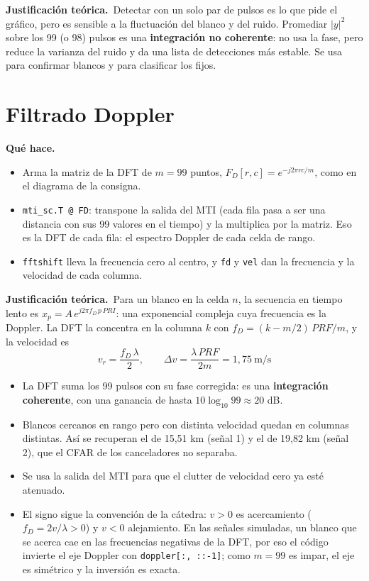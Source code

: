 \documentclass[11pt]{article}
\newcommand{\codigo}[2]{}
\newcommand{\teoria}{\par\textcolor{verde}{\textbf{Justificación teórica.}}\ }
\newcommand{\hace}{\par\textcolor{verde}{\textbf{Qué hace.}}\ }
\newcommand{\archivo}[1]{\texttt{#1}}
\begin{document}
\teoria Detectar con un solo par de pulsos es lo que pide el gráfico, pero es sensible a la fluctuación del blanco y del ruido. Promediar $|y|^2$ sobre los 99 (o 98) pulsos es una \textbf{integración no coherente}: no usa la fase, pero reduce la varianza del ruido y da una lista de detecciones más estable. Se usa para confirmar blancos y para clasificar los fijos.

\section{Filtrado Doppler}
\codigo{234}{244}
\hace
\begin{itemize}
  \item Arma la matriz de la DFT de $m = 99$ puntos, $F_D[r,c] = e^{-j2\pi rc/m}$, como en el diagrama de la consigna.
  \item \archivo{mti\_sc.T @ FD}: transpone la salida del MTI (cada fila pasa a ser una distancia con sus 99 valores en el tiempo) y la multiplica por la matriz. Eso es la DFT de cada fila: el espectro Doppler de cada celda de rango.
  \item \archivo{fftshift} lleva la frecuencia cero al centro, y \archivo{fd} y \archivo{vel} dan la frecuencia y la velocidad de cada columna.
\end{itemize}

\teoria Para un blanco en la celda $n$, la secuencia en tiempo lento es $x_p = A\,e^{j2\pi f_D\,p\,PRI}$: una exponencial compleja cuya frecuencia es la Doppler. La DFT la concentra en la columna $k$ con $f_D = (k - m/2)\,PRF/m$, y la velocidad es
\[ v_r = \frac{f_D\,\lambda}{2}, \qquad \Delta v = \frac{\lambda\,PRF}{2m} = 1{,}75\ \text{m/s} \]
\begin{itemize}
  \item La DFT suma los 99 pulsos con su fase corregida: es una \textbf{integración coherente}, con una ganancia de hasta $10\log_{10} 99 \approx 20$ dB.
  \item Blancos cercanos en rango pero con distinta velocidad quedan en columnas distintas. Así se recuperan el de 15,51 km (señal 1) y el de 19,82 km (señal 2), que el CFAR de los canceladores no separaba.
  \item Se usa la salida del MTI para que el clutter de velocidad cero ya esté atenuado.
  \item El signo sigue la convención de la cátedra: $v > 0$ es acercamiento ($f_D = 2v/\lambda > 0$) y $v < 0$ alejamiento. En las señales simuladas, un blanco que se acerca cae en las frecuencias negativas de la DFT, por eso el código invierte el eje Doppler con \archivo{doppler[:, ::-1]}; como $m = 99$ es impar, el eje es simétrico y la inversión es exacta.
\end{itemize}
\end{document}
